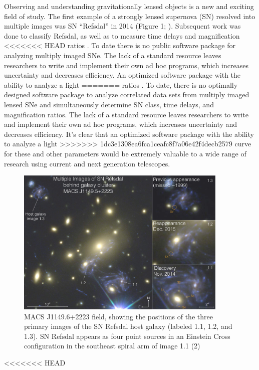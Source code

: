 \thispagestyle{fancy}
\lhead{}
\rhead{}
\renewcommand{\headrulewidth}{1pt}
\renewcommand{\footrulewidth}{0pt}
\newcommand{\packageName}{\textit{SNTD}}
\fancyfoot[C]{}

\pagestyle{fancy}

Observing and understanding gravitationally lensed objects is a new
and exciting field of study. The first example of a strongly lensed
supernova (SN) resolved into multiple images was SN ``Refsdal'' in
2014 (Figure 1; \citet{Kelly:2015a}). Subsequent work was done to
classify Refsdal, as well as to measure time delays and magnification
<<<<<<< HEAD
ratios \citep{Kelly:2016,Rodney:2016}. To date there is no public software 
package for analyzing multiply imaged SNe. The lack of a standard resource
leaves researchers to write and implement their own ad hoc programs,
which increases uncertainty and decreases efficiency. An optimized software package with the ability to analyze a light
=======
ratios \citep{Kelly:2016,Rodney:2016}. To date, there is no optimally
designed software package to analyze correlated data sets from
multiply imaged lensed SNe and simultaneously determine SN class, time
delays, and magnification ratios. The lack of a standard resource
leaves researchers to write and implement their own ad hoc programs,
which increases uncertainty and decreases efficiency. It's clear that
an optimized software package with the ability to analyze a light
>>>>>>> 1dc3e1308ea6fca1ceafc8f7a06e42f4decb2579
curve for these and other parameters would be extremely valuable to a
wide range of research using current and next generation telescopes.

\begin{figure}[h]
\centering
\includegraphics[width=0.9\textwidth]{refsdal_rodney.pdf}
\caption{
MACS J1149.6+2223 field, showing the positions of the three primary
images of the SN Refsdal host galaxy (labeled 1.1, 1.2, and 1.3). SN
Refsdal appears as four point sources in an Einstein Cross
configuration in the southeast spiral arm of image 1.1 (2)}
\end{figure}
<<<<<<< HEAD



